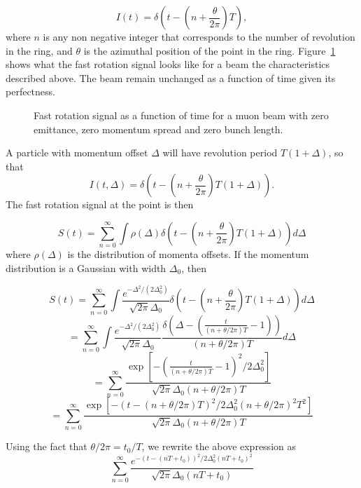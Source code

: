 \begin{equation}
I(t)=\delta\left(t-\left(n+\frac{\theta}{2\pi}\right)T\right),
\end{equation} 
where $n$ is any non negative integer that corresponds to the number of revolution in the ring, 
and $\theta$ is the azimuthal position of the point in the ring.
Figure~\ref{fig:perfect_frs} shows what the fast rotation signal looks like for a beam the characteristics described above.
The beam remain unchanged as a function of time given its perfectness.

\begin{figure}[bt]

\caption{Fast rotation signal as a function of time for a muon beam with zero emittance, zero momentum spread and zero bunch length.}
\label{fig:perfect_frs}
\end{figure}
 
A particle with momentum offset $\Delta$ will have revolution period $T(1+\Delta)$, so that 
\begin{equation}
I(t,\Delta)=\delta\left(t-\left(n+\frac{\theta}{2\pi}\right)T\left(1+\Delta\right)\right). 
\end{equation}
The fast rotation signal at the point is then 

\begin{equation}
S(t)=\sum^{\infty}_{n=0}\int\rho(\Delta)\delta\left(t-\left(n+\frac{\theta}{2\pi}\right)T\left(1+\Delta\right)\right)d\Delta 
\end{equation}
where $\rho(\Delta)$ is the distribution of momenta offsets. If the momentum distribution is a Gaussian with width $\Delta_0$, then 

\[S(t) =\sum^{\infty}_{n=0}\int\frac{e^{-\Delta^2/(2\Delta^2_0)}}{\sqrt{2\pi}\Delta_0}
\delta\left(t-\left(n+\frac{\theta}{2\pi}\right)T\left(1+\Delta\right)\right)d\Delta\]
\[=\sum^{\infty}_{n=0}\int\frac{e^{-\Delta^2/(2\Delta^2_0)}}{\sqrt{2\pi}\Delta_0}\frac{\delta\left(\Delta-\left(\frac{t}{(n+\theta/2\pi)T}-1\right)\right)}{(n+\theta/2\pi)T}d\Delta\]
\[=\sum^{\infty}_{n=0}\frac{\exp[-(\frac{t}{(n+\theta/2\pi)T}-1)^2/2\Delta^2_0]}{\sqrt{2\pi}\Delta_0(n+\theta/2\pi)T}\]
\[=\sum^{\infty}_{n=0}\frac{\exp[-(t-(n+\theta/2\pi)T)^2/2\Delta^2_0(n+\theta/2\pi)^2T^2]}{\sqrt{2\pi}\Delta_0(n+\theta/2\pi)T}\]

Using the fact that $\theta/2\pi=t_0/T$, we rewrite the above expression as 
\begin{equation}
\sum^{\infty}_{n=0}\frac{e^{-(t-(nT+t_0))^2/2\Delta^2_0(nT+t_0)^2}}{\sqrt{2\pi}\Delta_0(nT+t_0)}
\label{eq:Espread_frs}
\end{equation}

